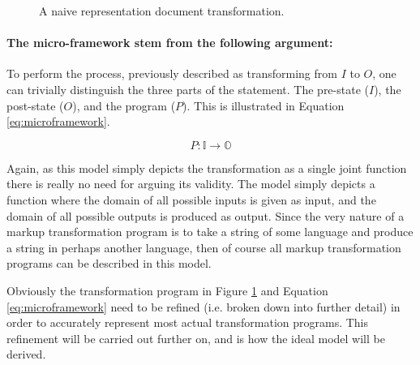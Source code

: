 \documentclass{scrreprt}
\begin{document}
\begin{figure}[h]
  \centering


  \caption{A naive representation document transformation.}
  \label{fig:workflows-framework}
\end{figure}


\paragraph{The micro-framework stem from the following argument: } To perform the process, previously described as transforming from $I$ to $O$, one can trivially distinguish the three parts of the statement. The pre-state ($I$), the post-state ($O$), and the program ($P$). This is illustrated in Equation \ref{eq:microframework}.

\begin{equation}
  P : \mathbb{I} \rightarrow \mathbb{O}
  \label{eq:microframework}
\end{equation}

Again, as this model simply depicts the transformation as a single joint function there is really no need for arguing its validity. The model simply depicts a function where the domain of all possible inputs is given as input, and the domain of all possible outputs is produced as output. Since the very nature of a markup transformation program is to take a string of some language and produce a string in perhaps another language, then of course all markup transformation programs can be described in this model.


Obviously the transformation program in Figure \ref{fig:workflows-framework} and Equation \ref{eq:microframework} need to be refined (i.e. broken down into further detail) in order to accurately represent most actual transformation programs. This refinement will be carried out further on, and is how the ideal model will be derived.
\end{document}
